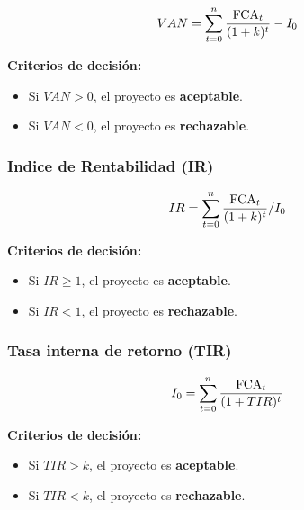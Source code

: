 \documentclass{templateNote}
\begin{document}
\begin{align*}
    VAN &= \sum_{t=0}^{n} \frac{\textnormal{FCA}_t}{(1+k)^t} - I_0
\end{align*}

\textbf{Criterios de decisión:}
\begin{itemize}
    \item Si $VAN > 0$, el proyecto es \textbf{aceptable}.
    \item Si $VAN < 0$, el proyecto es \textbf{rechazable}.
\end{itemize}

\subsubsection{Indice de Rentabilidad (IR)}

\begin{align*}
    IR &= \sum_{t=0}^{n} \frac{\textnormal{FCA}_t}{(1+k)^t}/I_0
\end{align*}

\textbf{Criterios de decisión:}
\begin{itemize}
    \item Si $IR \geq 1$, el proyecto es \textbf{aceptable}.
    \item Si $IR < 1$, el proyecto es \textbf{rechazable}.
\end{itemize}

\subsubsection{Tasa interna de retorno (TIR)}

\begin{align*}
    I_0 &= \sum_{t=0}^{n} \frac{\textnormal{FCA}_t}{(1+TIR)^t}
\end{align*}

\textbf{Criterios de decisión:}
\begin{itemize}
    \item Si $TIR > k$, el proyecto es \textbf{aceptable}.
    \item Si $TIR < k$, el proyecto es \textbf{rechazable}.
\end{itemize}
\end{document}
